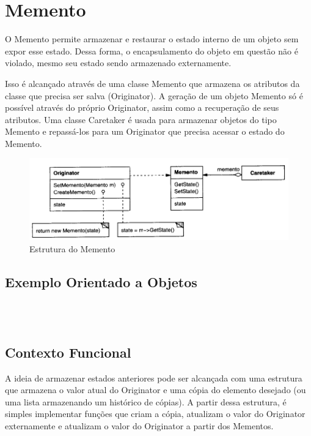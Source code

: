 \section{Memento}

O Memento permite armazenar e restaurar o estado interno de um 
objeto sem expor esse estado. Dessa forma, o encapsulamento do 
objeto em questão não é violado, mesmo seu estado sendo armazenado 
externamente.

Isso é alcançado através de uma classe Memento que armazena os 
atributos da classe que precisa ser salva (Originator). A geração 
de um objeto Memento só é possível através do próprio Originator, 
assim como a recuperação de seus atributos. Uma classe Caretaker 
é usada para armazenar objetos do tipo Memento e repassá-los para 
um Originator que precisa acessar o estado do Memento.

\begin{figure}[htb]
	\caption{\label{memento_struct}Estrutura do Memento}
	\begin{center}
	    \includegraphics[scale=0.5]{5_padroes-contexto-funcional/5.3_comportamentais/5.3.06_memento/diagram.png}
	\end{center}
\end{figure}

\subsection*{Exemplo Orientado a Objetos}

\begin{lstlisting}[caption={Memento Orientação a Objetos},label=oomemento]



\end{lstlisting}

\subsection*{Contexto Funcional}

A ideia de armazenar estados anteriores pode ser alcançada com uma 
estrutura que armazena o valor atual do Originator e uma cópia do 
elemento desejado (ou uma lista armazenando um histórico de cópias). 
A partir dessa estrutura, é simples implementar funções que criam 
a cópia, atualizam o valor do Originator externamente e atualizam 
o valor do Originator a partir dos Mementos.

\begin{lstlisting}[caption={Memento Funcional},label=fpmemento]



\end{lstlisting}